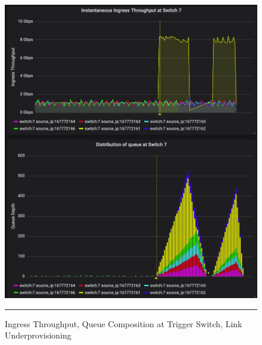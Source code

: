 \begin{figure}[htbp]
	\centering
		\includegraphics[width=1.0\columnwidth]{Figures/ingress_throughput_queue_comp_under.png}
		\rule{35em}{0.5pt}
	\caption[Ingress Throughput, Queue Composition at Trigger Switch, Link Underprovisioning]{Ingress Throughput, Queue Composition at Trigger Switch, Link Underprovisioning}
	\label{fig:ing_throughput_under}
\end{figure}


